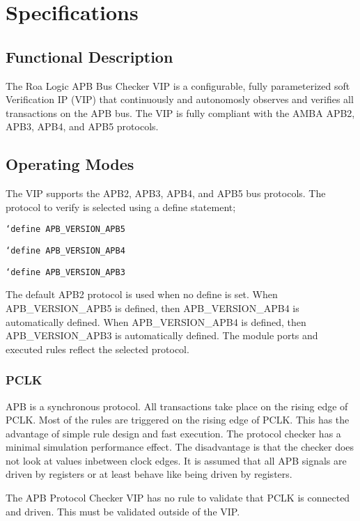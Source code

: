 \chapter{Specifications} \label{specifications}

\section{Functional Description}\label{functional-description}

The Roa Logic APB Bus Checker VIP is a configurable, fully parameterized soft Verification IP (VIP)
that continuously and autonomosly observes and verifies all transactions on the APB bus.
The VIP is fully compliant with the AMBA APB2, APB3, APB4, and APB5 protocols.


\section{Operating Modes}\label{operating-modes}

The VIP supports the APB2, APB3, APB4, and APB5 bus protocols. The protocol to verify is selected using a define statement;

\texttt{`define APB\_VERSION\_APB5}

\texttt{`define APB\_VERSION\_APB4}

\texttt{`define APB\_VERSION\_APB3}

The default APB2 protocol is used when no define is set. When APB\_VERSION\_APB5 is defined, then APB\_VERSION\_APB4 is automatically defined. When APB\_VERSION\_APB4 is defined, then APB\_VERSION\_APB3 is automatically defined.
The module ports and executed rules reflect the selected protocol.
 

\subsection{PCLK}\label{PCLK}
APB is a synchronous protocol. All transactions take place on the rising edge of PCLK.
Most of the rules are triggered on the rising edge of PCLK. This has the advantage of simple rule design and fast execution. The protocol checker has a minimal simulation performance effect. The disadvantage is that the checker does not look at values inbetween clock edges. It is assumed that all APB signals are driven by registers or at least behave like being driven by registers.

The APB Protocol Checker VIP has no rule to validate that PCLK is connected and driven. This must be validated outside of the VIP.

